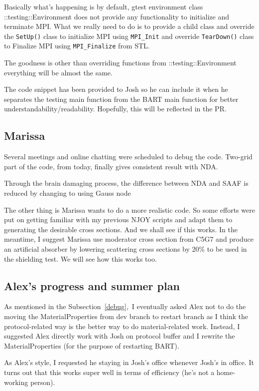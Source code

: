 \documentclass{article}
\begin{document}
Basically what's happening is by default, gtest environment class {::testing::Environment} does 
not provide any functionality to initialize and terminate MPI. What we really need to do is 
to provide a child class and override the {\tt SetUp()} class to initialize MPI using {\tt MPI\_Init} and override {\tt TearDown()}
class to Finalize MPI using {\tt MPI\_Finalize} from STL.

The goodness is other than overriding functions from {::testing::Environment} everything will be almost the same.

The code snippet has been provided to Josh so he can include it when he separates the testing main function
from the BART main function for better understandability/readability. Hopefully, this will be reflected in the PR.

\subsection{Marissa}
Several meetings and online chatting were scheduled to debug the code. Two-grid part of the code, from today,
finally gives consistent result with NDA.

Through the brain damaging process, the difference between NDA and SAAF is reduced by changing to using
Gauss node

The other thing is Marissa wants to do a more realistic code. So some efforts were put on
getting familiar with my previous NJOY scripts and adapt them to generating the desirable 
cross sections. And we shall see if this works. In the meantime, I suggest Marissa use
moderator cross section from C5G7 and produce an artificial absorber by lowering
scattering cross sections by 20\% to be used in the shielding test. We will see how this works too.

\subsection{Alex's progress and summer plan}\label{alex}
As mentioned in the Subsection\ \ref{debug},\ I eventually asked Alex not to do the moving
the MaterialProperties from dev branch to restart branch 
as I think the protocol-related way is the better way to do material-related work. Instead,
I suggested Alex directly work with Josh on protocol buffer and I rewrite the MaterialProperties
(for the purpose of restarting BART).

As Alex's style, I requested he staying in Josh's office whenever Josh's in office. It turns out that
this works super well in terms of efficiency (he's not a home-working person).
\end{document}
